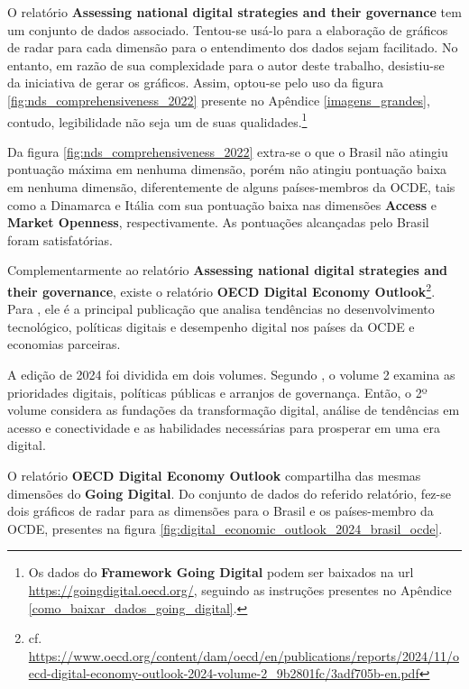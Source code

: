 O relatório \textbf{Assessing national digital strategies and their governance} tem um conjunto de dados associado. Tentou-se usá-lo para a elaboração de gráficos de radar para cada dimensão para o entendimento dos dados sejam facilitado. No entanto, em razão de sua complexidade para o autor deste trabalho, desistiu-se da iniciativa de gerar os gráficos. Assim, optou-se pelo uso da figura \ref{fig:nds_comprehensiveness_2022} presente no Apêndice \ref{imagens_grandes},  contudo, legibilidade não seja um de suas qualidades.\footnote{Os dados do \textbf{Framework Going Digital} podem ser baixados na url \url{https://goingdigital.oecd.org/}, seguindo as instruções presentes no Apêndice \ref{como_baixar_dados_going_digital}.}

Da figura \ref{fig:nds_comprehensiveness_2022} extra-se o que o Brasil não atingiu pontuação máxima em nenhuma dimensão, porém não atingiu pontuação baixa em nenhuma dimensão, diferentemente de alguns países-membros da OCDE, tais como a Dinamarca e Itália com sua pontuação baixa nas dimensões \textbf{Access} e \textbf{Market Openness}, respectivamente. As pontuações alcançadas pelo Brasil foram satisfatórias.

Complementarmente ao relatório \textbf{Assessing national digital strategies and their governance}, existe o relatório \textbf{OECD Digital Economy Outlook}\footnote{cf. \url{https://www.oecd.org/content/dam/oecd/en/publications/reports/2024/11/oecd-digital-economy-outlook-2024-volume-2_9b2801fc/3adf705b-en.pdf}}. Para \cite{digital_economy_outlook_v2_2024}, ele é a principal publicação que analisa tendências no desenvolvimento tecnológico, políticas digitais e desempenho digital nos países da OCDE e economias parceiras.

A edição de 2024 foi dividida em dois volumes. Segundo \cite{digital_economy_outlook_v2_2024}, o volume 2 examina as prioridades digitais, políticas públicas e arranjos de governança. Então, o 2º volume considera as fundações da transformação digital, análise de tendências em acesso e conectividade e as habilidades necessárias para prosperar em uma era digital.

O relatório \textbf{OECD Digital Economy Outlook} compartilha das mesmas dimensões do \textbf{Going Digital}. Do conjunto de dados do referido relatório, fez-se dois gráficos de radar para as dimensões para o Brasil e os países-membro da OCDE, presentes na figura \ref{fig:digital_economic_outlook_2024_brasil_ocde}.

